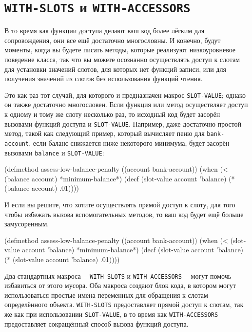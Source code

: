 \section{\texttt{WITH-SLOTS} и \texttt{WITH-ACCESSORS}}

В то время как функции доступа делают ваш код более лёгким для сопровождения, они все ещё
достаточно многословны.  И конечно, будут моменты, когда вы будете писать методы, которые
реализуют низкоуровневое поведение класса, так что вы можете осознанно осуществлять доступ
к слотам для установки значений слотов, для которых нет функций записи, или для получения
значений из слотов без использования функций чтения.

Это как раз тот случай, для которого и предназначен макрос \lstinline{SLOT-VALUE}; однако он
также достаточно многословен.  Если функция или метод осуществляет доступ к одному и тому
же слоту несколько раз, то исходный код будет засорён вызовами функций доступа и
\lstinline{SLOT-VALUE}.  Например, даже достаточно простой метод, такой как следующий пример,
который вычисляет пеню для \lstinline{bank-account}, если баланс снижается ниже некоторого
минимума, будет засорён вызовами \lstinline{balance} и \lstinline{SLOT-VALUE}:

\begin{myverb}
(defmethod assess-low-balance-penalty ((account bank-account))
  (when (< (balance account) *minimum-balance*)
    (decf (slot-value account 'balance) (* (balance account) .01))))
\end{myverb}

И если вы решите, что хотите осуществлять прямой доступ к слоту, для того чтобы
избежать вызова вспомогательных методов, то ваш код будет ещё больше замусоренным.

\begin{myverb}
(defmethod assess-low-balance-penalty ((account bank-account))
  (when (< (slot-value account 'balance) *minimum-balance*)
    (decf (slot-value account 'balance) (* (slot-value account 'balance) .01))))
\end{myverb}

Два стандартных макроса~-- \lstinline{WITH-SLOTS} и \lstinline{WITH-ACCESSORS}~-- могут помочь
избавиться от этого мусора.  Оба макроса создают блок кода, в котором могут использоваться
простые имена переменных для обращения к слотам определённого объекта.  \lstinline{WITH-SLOTS}
предоставляет прямой доступ к слотам, так же как при использовании \lstinline{SLOT-VALUE}, в то
время как \lstinline{WITH-ACCESSORS} предоставляет сокращённый способ вызова функций доступа.

